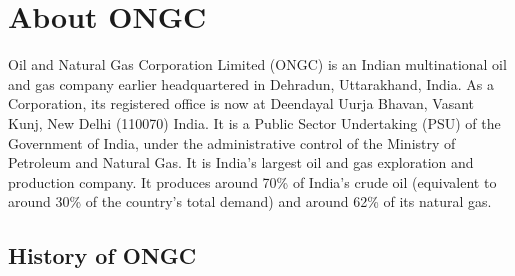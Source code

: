 \chapter{About ONGC}

Oil and Natural Gas Corporation Limited (ONGC) is an Indian multinational oil and gas company earlier headquartered in Dehradun, Uttarakhand, India. As a Corporation, its registered office is now at Deendayal Uurja Bhavan, Vasant Kunj, New Delhi (110070) India. It is a Public Sector Undertaking (PSU) of the
Government of India, under the administrative control of the Ministry of Petroleum and Natural Gas. It is India's largest oil and gas exploration and production company. It produces around 70\% of India's crude oil (equivalent to around 30\% of the country's total demand) and around 62\% of its natural gas.

\section{History of ONGC}

